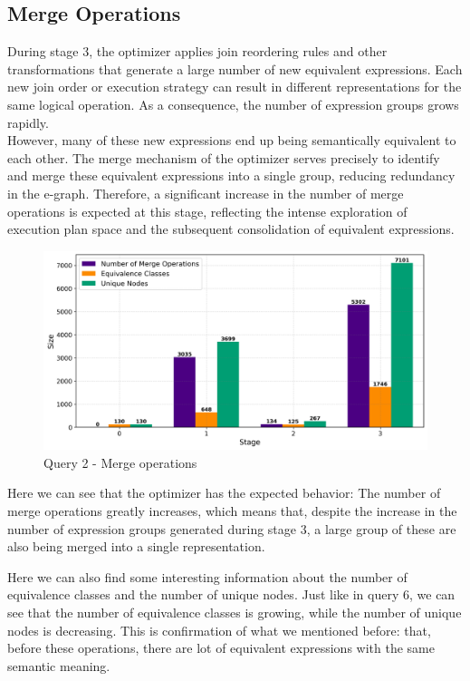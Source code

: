 \documentclass[a4paper,12pt]{scrreprt}
\begin{document}
\subsection{Merge Operations}


During stage 3, the optimizer applies join reordering rules and other transformations that generate a large number of new equivalent expressions. Each new join order or execution strategy can result in different representations for the same logical operation. As a consequence, the number of expression groups grows rapidly. \\
However, many of these new expressions end up being semantically equivalent to each other. The merge mechanism of the optimizer serves precisely to identify and merge these equivalent expressions into a single group, reducing redundancy in the e-graph. Therefore, a significant increase in the number of merge operations is expected at this stage, reflecting the intense exploration of execution plan space and the subsequent consolidation of equivalent expressions.


\begin{figure}[H]
    \centering
    \includegraphics[width=\linewidth]{img_merges/q2_sizes.png}
    \caption{Query 2 - Merge operations}
    \label{fig:hist2}
\end{figure}

Here we can see that the optimizer has the expected behavior: The number of merge operations greatly increases, which means that, despite the increase in the number of expression groups generated during stage 3, a large group of these are also being merged into a single representation. 

Here we can also find some interesting information about the number of equivalence classes and the number of unique nodes. Just like in query 6, we can see that the number of equivalence classes is growing, while the number of unique nodes is decreasing. This is confirmation of what we mentioned before: that, before these operations, there are lot of equivalent expressions with the same semantic meaning. 
\end{document}
